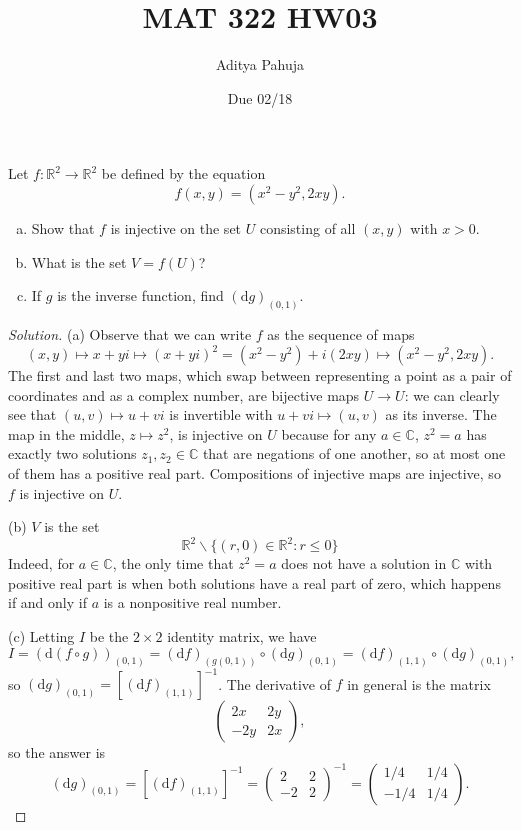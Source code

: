 \documentclass[10pt]{scrartcl}
\title{\vspace{-2em}MAT 322 HW03}
\author{\large Aditya Pahuja}
\date{\large Due 02/18}
\providecommand{\CC}{\mathbb C}
\providecommand{\RR}{\mathbb R}
\providecommand{\ii}{\item}
\providecommand{\setdiff}{\smallsetminus}
\providecommand{\inv}{^{-1}}
\newenvironment{soln}{\begin{proof}[Solution]}{\end{proof}}
\begin{document}
\maketitle

\begin{problem}
	Let $f\colon\RR^2\to\RR^2$ be defined by the equation
	\[f(x,y) = (x^2 - y^2, 2xy).\]
	\begin{enumerate}[(a)]
		\ii Show that $f$ is injective on the set $U$ consisting of
		all $(x,y)$ with $x>0$.
		\ii What is the set $V = f(U)$?
		\ii If $g$ is the inverse function, find $(\mathrm dg)_{(0,1)}$.
	\end{enumerate}
\end{problem}

\begin{soln}
	(a)	Observe that we can write $f$ as the sequence of maps
	\[(x, y)\mapsto x + yi\mapsto (x + yi)^2 = (x^2 - y^2) + i(2xy)
	\mapsto (x^2 - y^2, 2xy).\]
	The first and last two maps, which swap between representing a point
	as a pair of coordinates and as a complex number,
	are bijective maps $U\to U$: we can clearly see that $(u, v)\mapsto u+vi$
	is invertible with $u+vi\mapsto(u,v)$ as its inverse.
	The map in the middle, $z\mapsto z^2$, is injective on $U$
	because for any $a\in\CC$, $z^2 = a$
	has exactly two solutions $z_1,z_2\in\CC$
	that are negations of one another,
	so at most one of them has a positive real part.
	Compositions of injective maps are injective,
	so $f$ is injective on $U$.
	
	(b) $V$ is the set
	\[\RR^2\setdiff\{(r,0)\in\RR^2 : r \le 0\}\]
	Indeed, for $a\in\CC$, the only time that $z^2 = a$
	does not have a solution in $\CC$ with positive real part
	is when both solutions have a real part of zero,
	which happens if and only if $a$ is a nonpositive real number.
	
	(c) Letting $I$ be the $2\times 2$ identity matrix, we have
	\[I = (\mathrm d(f\circ g))_{(0,1)} =
	(\mathrm df)_{(g(0,1))}\circ(\mathrm dg)_{(0,1)}
	= (\mathrm df)_{(1,1)}\circ(\mathrm dg)_{(0,1)},\]
	so $(\mathrm dg)_{(0,1)} = [(\mathrm df)_{(1,1)}]\inv$.
	The derivative of $f$ in general is the matrix
	\[\begin{pmatrix}
		2x&2y\\
		-2y&2x
	\end{pmatrix},\]
	so the answer is
	\[(\mathrm dg)_{(0,1)} = [(\mathrm df)_{(1,1)}]\inv = \begin{pmatrix}
		2&2\\-2&2
	\end{pmatrix}\inv = \boxed{\begin{pmatrix}
		1/4&1/4\\-1/4&1/4
	\end{pmatrix}}.\]
\end{soln}
\end{document}
